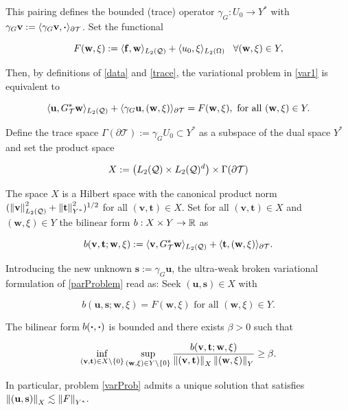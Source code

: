 This pairing defines the bounded (trace) operator $\gamma_G:U_0\to Y^*$ with $\gamma_G\mathbf{v}:=\langle \gamma_G\mathbf{v} , \boldsymbol{\cdot} \rangle_{\partial\mathcal{T}}$. Set the functional

\begin{equation}\label{data}
  F(\mathbf{w},\xi):=\langle \mathbf{f} , \mathbf{w} \rangle_{L_2(\mathcal{Q})}+\langle u_0 , \xi \rangle_{L_2(\Omega)}\hspace{0.3 cm}  \forall (\mathbf{w},\xi)\in Y,
\end{equation}


Then, by definitions of \eqref{data} and \eqref{trace}, the variational problem in \eqref{var1} is equivalent to

$$\langle \mathbf{u} , G^*_{\mathcal{T}}\mathbf{w} \rangle_{L_2(\mathcal{Q})}+\langle \gamma_G\mathbf{u} , (\mathbf{w},\xi) \rangle_{\partial\mathcal{T}}=F(\mathbf{w},\xi),\text{ for all }(\mathbf{w},\xi)\in Y.$$

Define the trace space $\Gamma(\partial\mathcal{T}):=\gamma_GU_0\subset Y^*$ as a subspace of the dual space $Y^*$ and set the product space 

$$X:=\left(L_2(\mathcal{Q})\times L_2(\mathcal{Q})^d\right)\times\Gamma(\partial\mathcal{T})$$

The space $X$ is a Hilbert space with the canonical product norm $(\left\lVert\mathbf{v} \right\rVert_{L_2(\mathcal{Q})}^2+\left\lVert\mathbf{t} \right\rVert^2_{Y^*})^{1/2}$ for all $(\mathbf{v},\mathbf{t})\in X$. Set for all $(\mathbf{v},\mathbf{t})\in X$ and $(\mathbf{w},\xi)\in Y$ the bilinear form $b:X\times Y\to\mathbb{R}$ as

\begin{equation}
    b(\mathbf{v},\mathbf{t};\mathbf{w},\xi):=\langle \mathbf{v} , G^*_{\mathcal{T}}\mathbf{w} \rangle_{L_2(\mathcal{Q})}+\langle \mathbf{t} , (\mathbf{w},\xi) \rangle_{\partial\mathcal{T}}.
\end{equation}

Introducing the new unknown $\mathbf{s}:=\gamma_G\mathbf{u}$, the ultra-weak broken variational formulation of \eqref{parProblem} read as: Seek $(\mathbf{u},\mathbf{s})\in X$ with

\begin{equation}\label{varProb}
    b(\mathbf{u},\mathbf{s};\mathbf{w},\xi)=F(\mathbf{w},\xi) \text{ for all } (\mathbf{w},\xi)\in Y.
\end{equation}

\begin{teor}\label{infsup}
    The bilinear form $b(\boldsymbol{\cdot},\boldsymbol{\cdot})$ is bounded and there exists $\beta>0$ such that

    \begin{equation}
        \inf_{(\mathbf{v},\mathbf{t})\in X\setminus\{0\}}\sup_{(\mathbf{w},\xi)\in Y\setminus\{0\}}\frac{b(\mathbf{v},\mathbf{t};\mathbf{w},\xi)}{\left\lVert(\mathbf{v},\mathbf{t}) \right\rVert_X\left\lVert(\mathbf{w},\xi) \right\rVert_Y}\geq \beta.    
    \end{equation}

    In particular, problem \eqref{varProb} admits a unique solution that satisfies $\left\lVert(\mathbf{u},\mathbf{s}) \right\rVert_X\lesssim\left\lVert F \right\rVert_{Y^*}$.
\end{teor}

